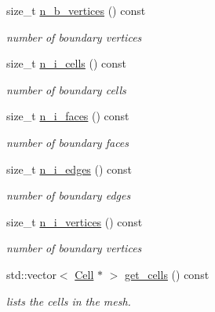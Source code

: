 \begin{DoxyCompactItemize}
size\+\_\+t \hyperlink{classHArDCore3D_1_1Mesh_a38e8f0bf1414441ceef7e3b39526ac23}{n\+\_\+b\+\_\+vertices} () const
\begin{DoxyCompactList}\small\item\em number of boundary vertices \end{DoxyCompactList}\item 
\mbox{\label{classHArDCore3D_1_1Mesh_ae31711c40d2d9888a6e8ca906bd2cbea}} 
size\+\_\+t \hyperlink{classHArDCore3D_1_1Mesh_ae31711c40d2d9888a6e8ca906bd2cbea}{n\+\_\+i\+\_\+cells} () const
\begin{DoxyCompactList}\small\item\em number of boundary cells \end{DoxyCompactList}\item 
\mbox{\label{classHArDCore3D_1_1Mesh_aa63c3fd9dc4f6336e14c95ca7d517d5a}} 
size\+\_\+t \hyperlink{classHArDCore3D_1_1Mesh_aa63c3fd9dc4f6336e14c95ca7d517d5a}{n\+\_\+i\+\_\+faces} () const
\begin{DoxyCompactList}\small\item\em number of boundary faces \end{DoxyCompactList}\item 
\mbox{\label{classHArDCore3D_1_1Mesh_a7650c95dec763d4aa3fcb44644229f0e}} 
size\+\_\+t \hyperlink{classHArDCore3D_1_1Mesh_a7650c95dec763d4aa3fcb44644229f0e}{n\+\_\+i\+\_\+edges} () const
\begin{DoxyCompactList}\small\item\em number of boundary edges \end{DoxyCompactList}\item 
\mbox{\label{classHArDCore3D_1_1Mesh_a209126a0e22bea2f597dbc844110123c}} 
size\+\_\+t \hyperlink{classHArDCore3D_1_1Mesh_a209126a0e22bea2f597dbc844110123c}{n\+\_\+i\+\_\+vertices} () const
\begin{DoxyCompactList}\small\item\em number of boundary vertices \end{DoxyCompactList}\item 
std\+::vector$<$ \hyperlink{classHArDCore3D_1_1Cell}{Cell} $\ast$ $>$ \hyperlink{group__Mesh_gabc945c1f5859943cc2e3f771d35e3b2e}{get\+\_\+cells} () const
\begin{DoxyCompactList}\small\item\em lists the cells in the mesh. \end{DoxyCompactList}\item 

\end{DoxyCompactItemize}
